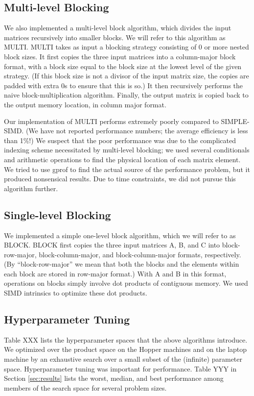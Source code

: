 \documentclass{article}
\begin{document}
\subsection{Multi-level Blocking}
We also implemented a multi-level block algorithm, which divides the input matrices recursively into smaller blocks.  We will refer to this algorithm as MULTI.  MULTI takes as input a blocking strategy consisting of 0 or more nested block sizes.  It first copies the three input matrices into a column-major block format, with a block size equal to the block size at the lowest level of the given strategy.  (If this block size is not a divisor of the input matrix size, the copies are padded with extra 0s to ensure that this is so.)  It then recursively performs the naive block-multiplication algorithm.  Finally, the output matrix is copied back to the output memory location, in column major format.

Our implementation of MULTI performs extremely poorly compared to SIMPLE-SIMD.  (We have not reported performance numbers; the average efficiency is less than 1\%!)  We suspect that the poor performance was due to the complicated indexing scheme necessitated by multi-level blocking; we used several conditionals and arithmetic operations to find the physical location of each matrix element.  We tried to use gprof to find the actual source of the performance problem, but it produced nonsensical results.  Due to time constraints, we did not pursue this algorithm further.

\subsection{Single-level Blocking}
We implemented a simple one-level block algorithm, which we will refer to as BLOCK. BLOCK first copies the three input matrices A, B, and C into block-row-major, block-column-major, and block-column-major formats, respectively.  (By ``block-row-major'' we mean that both the blocks and the elements within each block are stored in row-major format.)  With A and B in this format, operations on blocks simply involve dot products of contiguous memory.  We used SIMD intrinsics to optimize these dot products.


\subsection{Hyperparameter Tuning}
Table XXX lists the hyperparameter spaces that the above algorithms introduce.  We optimized over the product space on the Hopper machines and on the laptop machine by an exhaustive search over a small subset of the (infinite) parameter space.  Hyperparameter tuning was important for performance.  Table YYY in Section \ref{sec:results} lists the worst, median, and best performance among members of the search space for several problem sizes.
\end{document}
